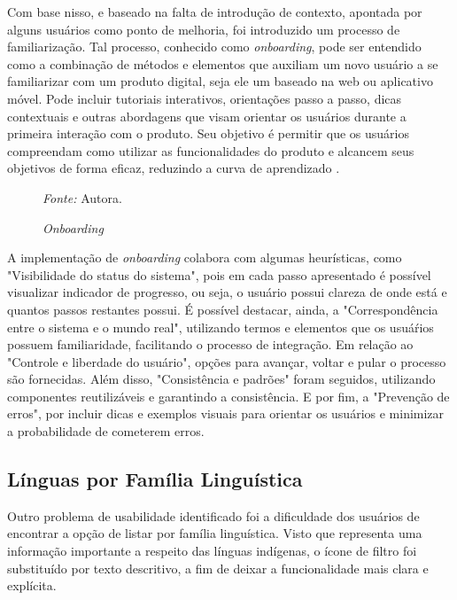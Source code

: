 Com base nisso, e baseado na falta de introdução de contexto, apontada por alguns usuários como ponto de 
melhoria, foi introduzido um processo de familiarização. Tal processo, conhecido como \textit{onboarding}, pode ser entendido como a combinação de métodos e elementos que auxiliam um novo usuário 
a se familiarizar com um produto digital, seja ele um baseado na web ou aplicativo móvel. Pode incluir tutoriais interativos, orientações passo a passo, dicas contextuais e outras abordagens que 
visam orientar os usuários durante a primeira interação com o produto. Seu objetivo é permitir que os usuários compreendam como utilizar as funcionalidades do produto e alcancem seus 
objetivos de forma eficaz, reduzindo a curva de aprendizado \cite{renz2014}.

\begin{figure}[h!]
	\centering
	\caption{\textit{Onboarding}}
	\begin{tablenotes}[flushleft]
		\centering
		\item \textit{Fonte:} Autora.
	\end{tablenotes}
	\label{fig22}
\end{figure}

A implementação de \textit{onboarding} colabora com algumas heurísticas, como "Visibilidade do status do sistema", pois em cada passo apresentado é possível visualizar indicador de progresso, ou seja, 
o usuário possui clareza de onde está e quantos passos restantes possui. É possível destacar, ainda, a "Correspondência entre o sistema e o mundo real", utilizando termos e elementos que os usuáŕios 
possuem familiaridade, facilitando o processo de integração. Em relação ao "Controle e liberdade do usuário", opções para avançar, voltar e pular o processo são fornecidas. Além disso, "Consistência e 
padrões" foram seguidos, utilizando componentes reutilizáveis e garantindo a consistência. E por fim, a "Prevenção de erros", por incluir dicas e exemplos visuais para orientar os usuários e  minimizar 
a probabilidade de cometerem erros.

\subsection{Línguas por Família Linguística}
\label{sec:Familia Linguistica}
Outro problema de usabilidade identificado foi a dificuldade dos usuários de encontrar a opção de listar por família linguística. Visto que representa uma informação importante a respeito das línguas indígenas, 
o ícone de filtro foi substituído por texto descritivo, a fim de deixar a funcionalidade mais clara e explícita.

